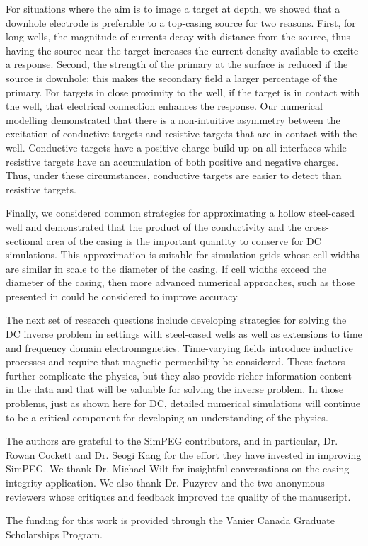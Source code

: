 \documentclass[extra,mreferee]{gji}
\begin{document}
For situations where the aim is to image a target at depth, we showed that a downhole electrode is preferable to a top-casing source for two reasons. First, for long wells, the magnitude of currents decay with distance from the source, thus having the source near the target increases the current density available to excite a response. Second, the strength of the primary at the surface is reduced if the source is downhole; this makes the secondary field a larger percentage of the primary.   For targets in close proximity to the well, if the target is in contact with the well, that electrical connection enhances the response. Our numerical modelling demonstrated that there is a non-intuitive asymmetry between the excitation of conductive targets and resistive targets that are in contact with the well. Conductive targets have a positive charge build-up on all interfaces while resistive targets have an accumulation of both positive and negative charges. Thus, under these circumstances, conductive targets are easier to detect than resistive targets.

Finally, we considered common strategies for approximating a hollow steel-cased well and demonstrated that the product of the conductivity and the cross-sectional area of the casing is the important quantity to conserve for DC simulations. This approximation is suitable for simulation grids whose cell-widths are similar in scale to the diameter of the casing. If cell widths exceed the diameter of the casing, then more advanced numerical approaches, such as those presented in \cite{Weiss2017, Caudillo-Mata2017a} could be considered to improve accuracy.

The next set of research questions include developing strategies for solving the DC inverse problem in settings with steel-cased wells as well as extensions to time and frequency domain electromagnetics. Time-varying fields introduce inductive processes and require that magnetic permeability be considered. These factors further complicate the physics, but they also provide richer information content in the data and that will be  valuable for solving the inverse problem. In those problems, just as shown here for DC, detailed numerical simulations will continue to be a critical component for developing an understanding of the physics.


\begin{acknowledgments}

The authors are grateful to the SimPEG contributors, and in particular, Dr. Rowan Cockett and Dr. Seogi Kang for the effort they have invested in improving SimPEG. We thank Dr. Michael Wilt for insightful conversations on the casing integrity application. We also thank Dr. Puzyrev and the two anonymous reviewers whose critiques and feedback improved the quality of the manuscript.

The funding for this work is provided through the Vanier Canada Graduate Scholarships Program.

\end{acknowledgments}




\clearpage
\end{document}
